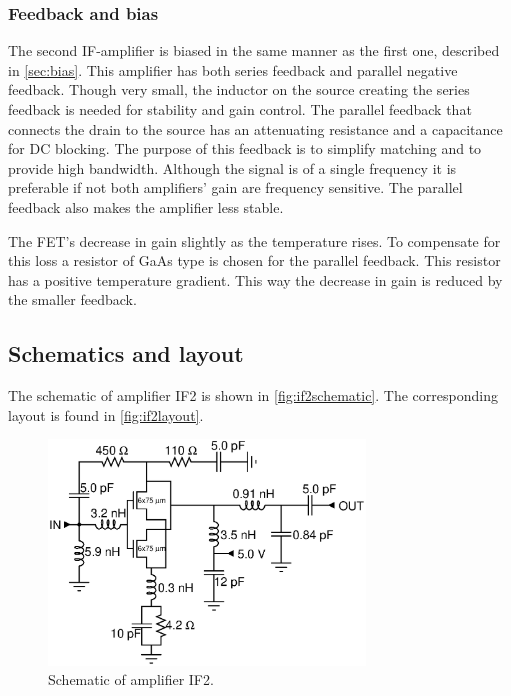 			\subsubsection{Feedback and bias}
				The second IF-amplifier is biased in the same manner as the first one, described in \autoref{sec:bias}. This amplifier has both series feedback and parallel negative feedback. Though very small, the inductor on the source creating the series feedback is needed for stability and gain control. The parallel feedback that connects the drain to the source has an attenuating resistance and a capacitance for DC blocking. The purpose of this feedback is to simplify matching and to provide high bandwidth. Although the signal is of a single frequency it is preferable if not both amplifiers' gain are frequency sensitive. The parallel feedback also makes the amplifier less stable.
				
				The FET's decrease in gain slightly as the temperature rises. To compensate for this loss a resistor of GaAs type is chosen for the parallel feedback. This resistor has a positive temperature gradient. This way the decrease in gain is reduced by the smaller feedback.

		\subsection{Schematics and layout}
			The schematic of amplifier IF2 is shown in \autoref{fig:if2schematic}. The corresponding layout is found in \autoref{fig:if2layout}.
			
			\begin{figure}[hbt!]
				\centering
				\includegraphics[width=0.75\textwidth]{fig/amplifiers/if2/sch_if2}
				\caption[Amplifier IF2 schematic.]{Schematic of amplifier IF2.}\label{fig:if2schematic}
			\end{figure}


